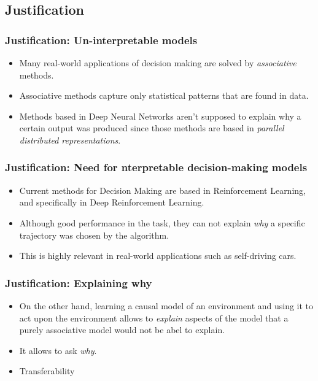 \documentclass{beamer}
\theoremstyle{plain}
\begin{document}
	\subsection{Justification}
	\begin{frame}
	\frametitle{Justification: Un-interpretable models}
	\begin{itemize}
	\item Many real-world applications of decision making are solved by \textit{associative} methods.
	\item Associative methods capture only statistical patterns that are found in data.
	\item Methods based in Deep Neural Networks aren't supposed to explain why a certain output was produced since those methods are based in \textit{parallel distributed representations}.
	\end{itemize}
	\end{frame}
	
	\begin{frame}
	\frametitle{Justification: Need for nterpretable decision-making models}
	\begin{itemize}
	\item Current methods for Decision Making are based in Reinforcement Learning, and specifically in Deep Reinforcement Learning. 
	\item Although good performance in the task, they can not explain \textit{why} a specific trajectory was chosen by the algorithm.
	\item This is highly relevant in real-world applications such as self-driving cars.
	\end{itemize}
	\end{frame}
	
	\begin{frame}
	\frametitle{Justification: Explaining why}
	\begin{itemize}
	\item On the other hand, learning a causal model of an environment and using it to act upon the environment allows to \textit{explain} aspects of the model that a purely associative model would not be abel to explain. 
	\item It allows to ask \textit{why}.
	\item Transferability
	\end{itemize}
	\end{frame}
\end{document}
